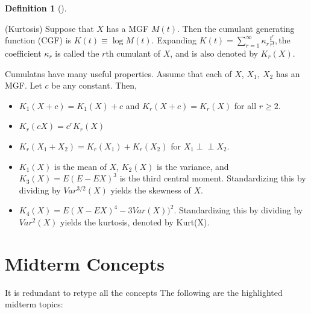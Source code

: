 \documentclass[
  letterpaper,
  DIV=11,
  numbers=noendperiod]{scrreprt}
\theoremstyle{definition}
\newtheorem{definition}{Definition}[chapter]
\theoremstyle{plain}
\theoremstyle{remark}
\begin{document}
\leavevmode{}%
\begin{definition}[]\label{def-kurtosis}

(Kurtosis) Suppose that \(\displaystyle X\) has a MGF
\(\displaystyle M( t)\). Then the cumulant generating function (CGF) is
\(\displaystyle K( t) \equiv \log M( t)\). Expanding
\(\displaystyle K( t) =\sum _{r=1}^{\infty } \kappa _{r}\frac{t^{r}}{r!} ,\)the
coefficient \(\displaystyle \kappa _{r}\) is called the
\(\displaystyle r\)th cumulant of \(\displaystyle X\), and is also
denoted by \(\displaystyle K_{r}( X)\).

Cumulatns have many useful properties. Assume that each of
\(\displaystyle X\), \(\displaystyle X_{1} ,\ X_{2}\) has an MGF. Let
\(\displaystyle c\) be any constant. Then,

\begin{itemize}
\item
  \(\displaystyle K_{1}( X+c) =K_{1}( X) +c\) and
  \(\displaystyle K_{r}( X+c) =K_{r}( X)\) for all
  \(\displaystyle r\geqslant 2\).
\item
  \(\displaystyle K_{r}( cX) =c^{r} K_{r}( X)\)
\item
  \(\displaystyle K_{r}( X_{1} +X_{2}) =K_{r}( X_{1}) +K_{r}( X_{2})\)
  for \(\displaystyle X_{1} \perp\!\!\!\!\perp X_{2}\).
\item
  \(\displaystyle K_{1}( X)\) is the mean of \(\displaystyle X\),
  \(\displaystyle K_{2}( X)\) is the variance, and
  \(\displaystyle K_{3}( X) =E( E-EX)^{3}\) is the third central moment.
  Standardizing this by dividing by \(\displaystyle Var^{3/2}( X)\)
  yields the skewness of \(\displaystyle X\).
\item
  \(\displaystyle K_{4}( X) =E( X-EX)^{4} -3Var( X))^{2}\).
  Standardizing this by dividing by \(\displaystyle Var^{2}( X)\) yields
  the kurtosis, denoted by Kurt(X).
\end{itemize}

\end{definition}

\hypertarget{midterm-concepts}{%
\section*{Midterm Concepts}\label{midterm-concepts}}


It is redundant to retype all the concepts The following are the
highlighted midterm topics:
\end{document}

